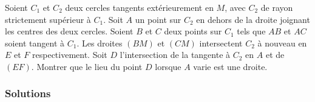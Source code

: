 \begin{exo}
Soient $C_1$ et $C_2$ deux cercles tangents extérieurement en $M$, avec $C_2$ de rayon strictement supérieur à $C_1$. Soit $A$ un point sur $C_2$ en dehors de la droite joignant les centres des deux cercles. Soient $B$ et $C$ deux points sur $C_1$ tels que $AB$ et $AC$ soient tangent à $C_1$. Les droites $(BM)$ et $(CM)$ intersectent $C_2$ à nouveau en $E$ et $F$ respectivement. Soit $D$ l'intersection de la tangente à $C_2$ en $A$ et de $(EF)$. Montrer que le lieu du point $D$ lorsque $A$ varie est une droite.
\end{exo}


\subsubsection{Solutions}


